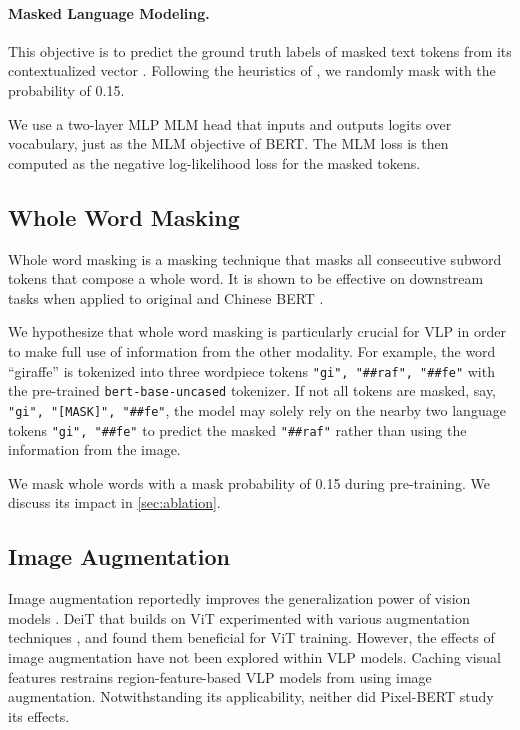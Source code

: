 \documentclass{article}
\begin{document}
\paragraph{Masked Language Modeling.}
This objective is to predict the ground truth labels of masked text tokens  from its contextualized vector .
Following the heuristics of \citet{devlin2019bert}, we randomly mask  with the probability of 0.15.

We use a two-layer MLP MLM head that inputs  and outputs logits over vocabulary, just as the MLM objective of BERT.
The MLM loss is then computed as the negative log-likelihood loss for the masked tokens.

\subsection{Whole Word Masking}
\label{sec:wwm}
Whole word masking is a masking technique that masks all consecutive subword tokens that compose a whole word.
It is shown to be effective on downstream tasks when applied to original and Chinese BERT \citep{cui2019pre}.

We hypothesize that whole word masking is particularly crucial for VLP in order to make full use of information from the other modality.
For example, the word \enquote{giraffe} is tokenized into three wordpiece tokens \texttt{\lbrack"gi", "\#\#raf", "\#\#fe"\rbrack} with the pre-trained \texttt{bert-base-uncased} tokenizer. If not all tokens are masked, say, \texttt{\lbrack"gi", "[MASK]", "\#\#fe"\rbrack}, the model may solely rely on the nearby two language tokens \texttt{\lbrack"gi", "\#\#fe"\rbrack} to predict the masked \texttt{"\#\#raf"} rather than using the information from the image.

We mask whole words with a mask probability of 0.15 during pre-training.
We discuss its impact in \cref{sec:ablation}.

\subsection{Image Augmentation}

Image augmentation reportedly improves the generalization power of vision models \citep{shorten2019survey}.
DeiT \citep{touvron2020training} that builds on ViT experimented with various augmentation techniques \citep{zhang2017mixup,yun2019cutmix,berman2019multigrain,hoffer2020augment,cubuk2020randaugment}, and found them beneficial for ViT training.
However, the effects of image augmentation have not been explored within VLP models.
Caching visual features restrains region-feature-based VLP models from using image augmentation.
Notwithstanding its applicability, neither did Pixel-BERT study its effects.
\end{document}
